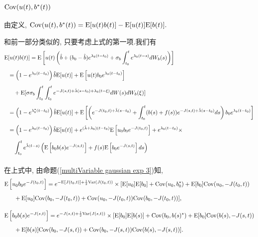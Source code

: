 \documentclass[notitlepage,cs4size,punct,oneside]{ctexrep}
\numberwithin{equation}{section}
\theoremstyle{mystyle}
\newcommand{\nq}{\\[5pt]}
\newcommand{\nw}{\\[10pt]}
\begin{document}
\subsubsection{$\text{Cov}(u(t), b^*(t))$}

由定义,
$
\text{Cov}(u(t), b^*(t)) = \text{E}[u(t)b(t)] - \text{E}[u(t)]\text{E}[b(t)].
$

和前一部分类似的, 只要考虑上式的第一项.我们有
\[
\begin{split}
\E&[u(t)b(t)] = \E\left[u(t)\left(\hat{b}+(b_0-\hat{b})e^{\lambda_b(t-t_0)}+\sigma_b\int_{t_0}^t e^{\lambda_b(t-s)}dW_b(s)\right)\right] \nq
&= \left(1-e^{\lambda_b(t-t_0)}\right)\hat{b}\E[u(t)] + \E\left[u(t)b_0e^{\lambda_b(t-t_0)}\right] \nq
&\quad + \E[\sigma\sigma_b\int_{t_0}^t\int_{t_0}^te^{-J(s, t)+\hat\lambda(s-t_0)+\lambda_b(t-\xi)}dW(s)dW_b(\xi)] \nq
&= \left(1-e^{\lambda_b^*(t-t_0)}\right)\hat{b}\E[u(t)] + \E\left[\left(e^{-J(t_0, t)+\hat\lambda(s-t_0)}+\int_{t_0}^t (b(s)+f(s))e^{-J(s, t)+\hat\lambda(s-t_0)}ds\right)b_0e^{\lambda_b(t-t_0)}\right] \nq
&= \left(1-e^{\lambda_b(t-t_0)}\right)\hat{b}\E[u(t)] + e^{(\hat\lambda+\lambda_b)(t-t_0)}\E\left[u_0b_0e^{-J(t_0, t)}\right] + e^{\lambda_b(t-t_0)}\times \nq
&\quad \int_{t_0}^t e^{\hat\lambda(t-s)}\left(\E\left[b_0b(s)e^{-J(s, t)}\right]+f(s)\E\left[b_0e^{-J(s, t)}\right]ds\right) \nq
\end{split}
\]

在上式中, 由命题(\ref{multiVariable gaussian exp 3})知,
\[
\begin{split}
\E&\left[u_0b_0e^{-J(t_0, t)}\right] = e^{-\E[J(t_0, t)]+\frac{1}{2}\Var(J(t_0, t))}\times[\E[u_0]\E[b_0]+\Cov(u_0, b_0^*)+\E[b_0]\Cov(u_0, -J(t_0, t))\nq
&\quad + \E[u_0]\Cov(b_0, -J(t_0, t))+\Cov(u_0, -J(t_0, t))\Cov(b_0, -J(t_0, t))], \nw
\E&\left[b_0b(s)e^{-J(s, t)}\right] = e^{-J(s, t)+\frac{1}{2}\Var(J(s, t))}\times [\E[b_0]\E[b(s)]+\Cov(b_0, b(s)^*)+\E[b_0]\Cov(b(s), -J(s, t)) \nq
&\quad + \E[b(s)]\Cov(b_0, -J(s, t)) + \Cov(b_0, -J(s, t))\Cov(b(s), -J(s, t))].
\end{split}
\]

\end{document}
